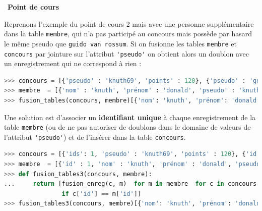 \documentclass[
  11pt,
]{article}
\newcommand{\passthrough}[1]{#1}
\newcounter{def}
\newcounter{cours}
\newenvironment{cours}[1]
{\par \medskip   \addtocounter{cours}{1} \noindent  
\begin{bclogo}[arrondi =0.1,  ombre = true, barre=none, logo=\bcbook, marge=4]{~\textbf{Point de cours} \textbf{\thecours} {\itshape #1} }  \par}
{
\end{bclogo}
 \par \bigskip }
\begin{document}
\begin{cours}{}

Reprenons l'exemple du point de cours 2 mais avec une personne
supplémentaire dans la table \passthrough{\lstinline!membre!}, qui n'a
pas participé au concours mais possède par hasard le même pseudo que
\passthrough{\lstinline!guido van rossum!}. Si on fusionne les tables
\passthrough{\lstinline!membre!} et \passthrough{\lstinline!concours!}
par jointure sur l'attribut \passthrough{\lstinline!'pseudo'!} on
obtient alors un doublon avec un enregistrement qui ne correspond à rien
:

\begin{lstlisting}[language=Python]
>>> concours = [{'pseudo' : 'knuth69', 'points' : 120}, {'pseudo' : 'guido42', 'points' : 10}]
>>> membre  = [{'nom' : 'knuth', 'prénom' : 'donald', 'pseudo' : 'knuth69'}, {'nom' : 'van rossum', 'prénom' : 'guido', 'pseudo' : 'guido42'}, {'nom' : 'python', 'prénom' : 'monty', 'pseudo' : 'guido42'}]
>>> fusion_tables(concours, membre)[{'nom': 'knuth', 'prénom': 'donald', 'pseudo': 'knuth69', 'points': 120}, {'nom': 'van rossum', 'prénom': 'guido', 'pseudo': 'guido42', 'points': 10}, {'nom': 'python', 'prénom': 'monty', 'pseudo': 'guido42', 'points': 10}]
\end{lstlisting}

Une solution est d'associer un \textbf{identifiant unique} à chaque
enregistrement de la table \passthrough{\lstinline!membre!} (ou de ne
pas autoriser de doublons dans le domaine de valeurs de l'attribut
\passthrough{\lstinline!'pseudo'!}) et de l'insérer dans la table
\passthrough{\lstinline!concours!}.

\begin{lstlisting}[language=Python]
>>> concours = [{'ids': 1, 'pseudo' : 'knuth69', 'points' : 120}, {'id' : 2, 'pseudo' : 'guido42', 'points' : 10}]
>>> membre  = [{'id' : 1, 'nom' : 'knuth', 'prénom' : 'donald', 'pseudo' : 'knuth69'}, {'id' : 2, 'nom' : 'van rossum', 'prénom' : 'guido', 'pseudo' : 'guido42'}, {'id' : 3, 'nom' : 'python', 'prénom' : 'monty', 'pseudo' : 'guido42'}]
>>> def fusion_tables3(concours, membre):
...     return [fusion_enreg(c, m)  for m in membre  for c in concours 
                if c['id'] == m['id']]
>>> fusion_tables3(concours, membre)[{'nom': 'knuth', 'prénom': 'donald', 'pseudo': 'knuth69', 'points': 120}, {'nom': 'van rossum', 'prénom': 'guido', 'pseudo': 'guido42', 'points': 10}]
\end{lstlisting}

\end{cours}
\end{document}

